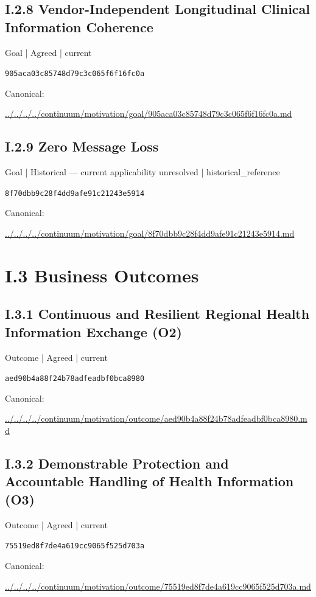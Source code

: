 \documentclass[10pt,a4paper]{article}
\begin{document}
\subsection*{I.2.8 Vendor-Independent Longitudinal Clinical Information Coherence}
{\small Goal | Agreed | current}\par
\texttt{905aca03c85748d79c3c065f6f16fc0a}\par
Canonical: \par
{\footnotesize\url{../../../../continuum/motivation/goal/905aca03c85748d79c3c065f6f16fc0a.md}}\par
\subsection*{I.2.9 Zero Message Loss}
{\small Goal | Historical — current applicability unresolved | historical\_reference}\par
\texttt{8f70dbb9c28f4dd9afe91c21243e5914}\par
Canonical: \par
{\footnotesize\url{../../../../continuum/motivation/goal/8f70dbb9c28f4dd9afe91c21243e5914.md}}\par
\section*{I.3 Business Outcomes}
\subsection*{I.3.1 Continuous and Resilient Regional Health Information Exchange (O2)}
{\small Outcome | Agreed | current}\par
\texttt{aed90b4a88f24b78adfeadbf0bca8980}\par
Canonical: \par
{\footnotesize\url{../../../../continuum/motivation/outcome/aed90b4a88f24b78adfeadbf0bca8980.md}}\par
\subsection*{I.3.2 Demonstrable Protection and Accountable Handling of Health Information (O3)}
{\small Outcome | Agreed | current}\par
\texttt{75519ed8f7de4a619cc9065f525d703a}\par
Canonical: \par
{\footnotesize\url{../../../../continuum/motivation/outcome/75519ed8f7de4a619cc9065f525d703a.md}}\par
\end{document}
